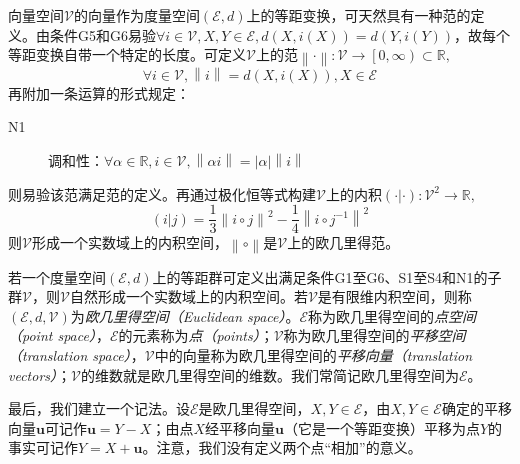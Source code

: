 \documentclass[main.tex]{subfiles}
\begin{document}
向量空间$\mathcal{V}$的向量作为度量空间$\left(\mathcal{E},d\right)$上的等距变换，可天然具有一种范的定义。由条件G5和G6易验$\forall i\in\mathcal{V},X,Y\in\mathcal{E},d\left(X,i\left(X\right)\right)=d\left(Y,i\left(Y\right)\right)$，故每个等距变换自带一个特定的长度。可定义$\mathcal{V}$上的范$\left\|\cdot\right\|:\mathcal{V}\rightarrow\left[0,\infty\right)\subset\mathbb{R},$
\[\forall i\in\mathcal{V},\left\|i\right\|=d\left(X,i\left(X\right)\right),X\in\mathcal{E}\]
再附加一条运算的形式规定：
\begin{description}
    \item[N1] 调和性：$\forall\alpha\in\mathbb{R},i\in\mathcal{V},\left\|\alpha i\right\|=\left|\alpha\right|\left\|i\right\|$
\end{description}
则易验该范满足范的定义。再通过极化恒等式构建$\mathcal{V}$上的内积$\left(\cdot|\cdot\right):\mathcal{V}^2\rightarrow\mathbb{R},$
\[\left(i|j\right)=\frac{1}{3}\left\|i\circ j\right\|^2-\frac{1}{4}\left\|i\circ j^{-1}\right\|^2\]
则$\mathcal{V}$形成一个实数域上的内积空间，$\left\|\circ\right\|$是$\mathcal{V}$上的欧几里得范。

\begin{definition}[欧几里得空间]
    若一个度量空间$\left(\mathcal{E},d\right)$上的等距群可定义出满足条件G1至G6、S1至S4和N1的子群$\mathcal{V}$，则$\mathcal{V}$自然形成一个实数域上的内积空间。若$\mathcal{V}$是有限维内积空间，则称$\left(\mathcal{E},d,\mathcal{V}\right)$为\emph{欧几里得空间（Euclidean space）}。$\mathcal{E}$称为欧几里得空间的\emph{点空间（point space）}，$\mathcal{E}$的元素称为\emph{点（points）}；$\mathcal{V}$称为欧几里得空间的\emph{平移空间（translation space）}，$\mathcal{V}$中的向量称为欧几里得空间的\emph{平移向量（translation vectors）}；$\mathcal{V}$的维数就是欧几里得空间的维数。我们常简记欧几里得空间为$\mathcal{E}$。
\end{definition}

最后，我们建立一个记法。设$\mathcal{E}$是欧几里得空间，$X,Y\in\mathcal{E}$，由$X,Y\in\mathcal{E}$确定的平移向量$\mathbf{u}$可记作$\mathbf{u}=Y-X$；由点$X$经平移向量$\mathbf{u}$（它是一个等距变换）平移为点$Y$的事实可记作$Y=X+\mathbf{u}$。注意，我们没有定义两个点“相加”的意义。
\end{document}
